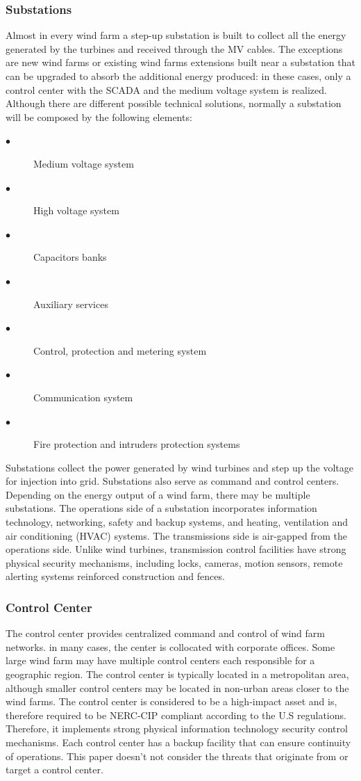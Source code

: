 \documentclass[twosided,a4,10pt]{article}
\begin{document}
\begin{multicols}{2}
  \subsubsection{Substations}
 Almost in every wind farm a step-up substation is built to collect all the energy generated by the turbines and received through the MV cables. The exceptions are new wind farms or existing wind farms extensions built near a substation that can be upgraded to absorb the additional energy produced: in these cases, only a control center with the SCADA and the medium voltage system is realized.
 Although there are different possible technical solutions, normally a substation will be composed by the following elements:
 \begin{description}
 	\item[$\bullet$]
 	Medium voltage system
 	\item[$\bullet$]
 	High voltage system
 	\item[$\bullet$]
 	Capacitors banks
 	\item[$\bullet$]
 	Auxiliary services
 	\item[$\bullet$]
 	Control, protection and metering system
 	\item[$\bullet$]
 	Communication system
 	\item[$\bullet$]
 	Fire protection and intruders protection systems
 \end{description}
 Substations collect the power generated by wind turbines and step up the voltage for injection into grid. Substations also serve as command and control centers. Depending on the energy output of a wind farm, there may be multiple substations.
 The operations side of a substation incorporates information technology, networking, safety and backup systems, and heating, ventilation and air conditioning (HVAC) systems. The transmissions side is air-gapped from the operations side. Unlike wind turbines, transmission control facilities have strong physical security mechanisms, including locks, cameras, motion sensors, remote alerting systems reinforced construction and fences.
 
 \subsubsection{Control Center}
 The control center provides centralized command and control of wind farm networks. in many cases, the center is collocated with corporate offices. Some large wind farm may have multiple control centers each responsible for a geographic region.
 The control center is typically located in a metropolitan area, although smaller control centers may be located in non-urban areas closer to the wind farms. The control center is considered to be a high-impact asset and is, therefore required to be NERC-CIP compliant according to the U.S regulations. Therefore, it implements strong physical information technology security control mechanisms. Each control center has a backup facility that can ensure continuity of operations. This paper doesn’t not consider the threats that originate from or target a control center.
     

\end{multicols}
\end{document}
